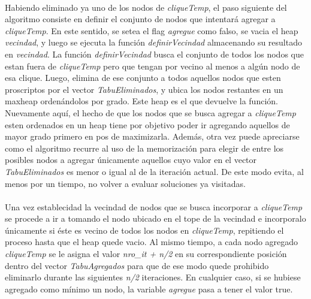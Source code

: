\paragraph{}
Habiendo eliminado ya uno de los nodos de \textit{cliqueTemp}, el paso siguiente del algoritmo consiste en definir el conjunto de nodos que intentará agregar a \textit{cliqueTemp}. En este sentido, se setea el flag \textit{agregue} como falso, se vacia el heap \textit{vecindad}, y luego se ejecuta la función \textit{definirVecindad} almacenando su resultado en \textit{vecindad}. La función \textit{definirVecindad} busca el conjunto de todos los nodos que estan fuera de \textit{cliqueTemp} pero que tengan por vecino al menos a algún nodo de esa clique. Luego, elimina de ese conjunto a todos aquellos nodos que esten proscriptos por el vector \textit{TabuEliminados}, y ubica los nodos restantes en un maxheap ordenándolos por grado. Este heap es el que devuelve la función. \\
Nuevamente aquí, el hecho de que los nodos que se busca agregar a \textit{cliqueTemp} esten ordenados en un heap tiene por objetivo poder ir agregando aquellos de mayor grado primero en pos de maximizarla. Además, otra vez puede apreciarse como el algoritmo recurre al uso de la memorización para elegir de entre los posibles nodos a agregar únicamente aquellos cuyo valor en el vector \textit{TabuEliminados} es menor o igual al de la iteración actual. De este modo evita, al menos por un tiempo, no volver a evaluar soluciones ya visitadas.

\paragraph{}
Una vez establecidad la vecindad de nodos que se busca incorporar a \textit{cliqueTemp} se procede a ir a tomando el nodo ubicado en el tope de la vecindad e incorporalo únicamente si éste es vecino de todos los nodos en \textit{cliqueTemp}, repitiendo el proceso hasta que el heap quede vacio. Al mismo tiempo, a cada nodo agregado \textit{cliqueTemp} se le asigna el valor \textit{nro\_it + n/2} en su correspondiente posición dentro del vector \textit{TabuAgregados} para que de ese modo quede prohibido eliminarlo durante las siguientes \textit{n/2} iteraciones. En cualquier caso, si se hubiese agregado como mínimo un nodo, la variable \textit{agregue} pasa a tener el valor true.

